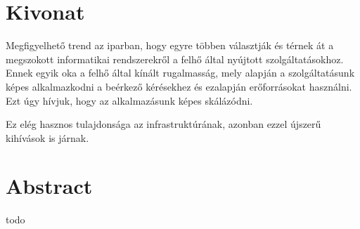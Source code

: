 \setcounter{page}{1}

\selecthungarian

\chapter*{Kivonat}

Megfigyelhető trend az iparban, hogy egyre többen választják és térnek át a megszokott informatikai rendszerekről a felhő által nyújtott szolgáltatásokhoz. Ennek egyik oka a felhő által kínált rugalmasság, mely alapján a szolgáltatásunk képes alkalmazkodni a beérkező kérésekhez és ezalapján erőforrásokat használni. Ezt úgy hívjuk, hogy az alkalmazásunk képes skálázódni.

Ez elég hasznos tulajdonsága az infrastruktúrának, azonban ezzel újszerű kihívások is járnak. 


\vfill
\selectenglish


\chapter*{Abstract}

todo


\vfill
\selectthesislanguage

\setcounter{romanPage}{\value{page}}
